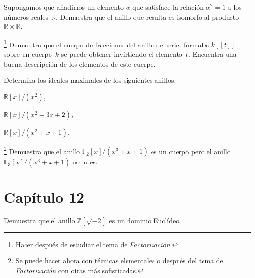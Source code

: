 \documentclass[12pt]{article}
\begin{document}
    
    \begin{exercise}[11.6.5]
        Supongamos que añadimos un elemento $\alpha$ que satisface la relación $\alpha^{2}=1$ a los números reales~$\mathbb{R}$. Demuestra que el anillo que resulta es isomorfo al producto~$\mathbb{R}\times \mathbb{R}$.
    \end{exercise}
    
    
    \begin{exercise}[11.7.4]\hspace{-4mm}\footnote{Hacer después de estudiar el tema de \emph{Factorización}.}
        Demuestra que el cuerpo de fracciones del anillo de series formales $k[\![t]\!]$ sobre un cuerpo~$k$ se puede obtener invirtiendo el elemento~$t$. Encuentra una buena descripción de los elementos de este cuerpo.
    \end{exercise}
    
    
    \begin{exercise}[11.8.2]
        Determina los ideales maximales de los siguientes anillos:
        
        \noindent
        \begin{inparaenum}[\bfseries (a)]
            \setcounter{enumi}{1}\item $\mathbb{R}[x]/(x^{2})$,
            \item $\mathbb{R}[x]/(x^{2}-3x+2)$,
            \item $\mathbb{R}[x]/(x^{2}+x+1)$.
        \end{inparaenum}
        
    \end{exercise}
    
    \begin{exercise}[11.8.3]\hspace{-4mm}\footnote{Se puede hacer ahora con técnicas elementales o después del tema de \emph{Factorización} con otras más sofisticadas.}
        Demuestra que el anillo $\mathbb{F}_{2}[x]/(x^{3}+x+1)$ es un cuerpo pero el anillo $\mathbb{F}_{3}[x]/(x^{3}+x+1)$ no lo es.
    \end{exercise}
    
    
    \section*{Capítulo 12}
    
    \begin{exercise}[2.6.b]
        Demuestra que el anillo $\mathbb{Z}[\sqrt{-2}]$ es un dominio Euclídeo.
    \end{exercise}
    
\end{document}
